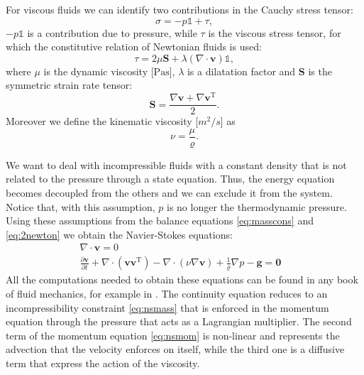 For viscous fluids we can identify two contributions in the Cauchy stress 
tensor:
\begin{equation}
\sigma = -p\mathbb{1} + \tau,
\end{equation}
$-p\mathbb{1}$ is a contribution due to pressure, while $\tau$ is 
the viscous stress tensor, for which the constitutive relation of Newtonian 
fluids is used:
\begin{equation}
\tau = 2\mu \mathbf{S} + 
\lambda (\nabla \cdot \mathbf{v}) \mathbb{1},
\end{equation}
where $\mu$ is the dynamic viscosity [$\si{\pascal\second}$], $\lambda$ 
is a dilatation factor and $\mathbf{S}$ is the symmetric strain rate tensor:
\begin{equation*}
\mathbf{S} = \frac{\nabla \mathbf{v} + \nabla \mathbf{v}^\mathrm{T}}{2}.
\end{equation*} 
Moreover we define the kinematic viscosity 
[$\si{m^2/s}$] as
\begin{equation}
\nu = \frac{\mu}{\varrho}.
\end{equation}

We want to deal with incompressible fluids with a constant density that is not 
related to the pressure through a state equation. Thus, the 
energy equation becomes decoupled from the others and we can exclude it from 
the system. 
Notice that, with this assumption, $p$ is no longer the thermodynamic pressure.
Using these assumptions from the balance equations 
\eqref{eq:masscons} and \eqref{eq:2newton} we obtain the Navier-Stokes 
equations:
\begin{align}
\label{eq:nsmass} \nabla \cdot \mathbf{v} = 0&\\
\label{eq:nsmom} \frac{\partial \mathbf{v}}{\partial t} + \nabla 
\cdot (\mathbf{v} \mathbf{v}^\mathrm{T}) - \nabla \cdot (\nu \nabla 
\mathbf{v}) + \frac{1}{\varrho}\nabla p  -\mathbf{g} = \mathbf{0}&
\end{align}
All the computations needed to obtain these equations can be found in any book 
of fluid mechanics, for example in \cite{main:vermal}. The continuity equation 
reduces to an incompressibility constraint \eqref{eq:nsmass} that is enforced 
in the momentum equation through the pressure that acts as a Lagrangian 
multiplier. The second term of the momentum equation \eqref{eq:nsmom} is 
non-linear and represents the advection that the velocity enforces on itself, 
while the third one is a diffusive term that express the action of the 
viscosity.
%

